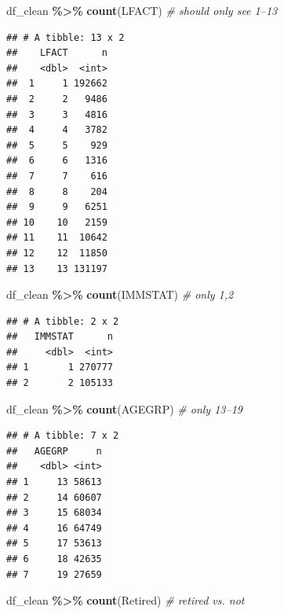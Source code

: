 \documentclass[
]{article}
\newenvironment{Shaded}{\begin{snugshade}}{\end{snugshade}}
\newcommand{\CommentTok}[1]{\textcolor[rgb]{0.56,0.35,0.01}{\textit{#1}}}
\newcommand{\FunctionTok}[1]{\textcolor[rgb]{0.13,0.29,0.53}{\textbf{#1}}}
\newcommand{\NormalTok}[1]{#1}
\newcommand{\SpecialCharTok}[1]{\textcolor[rgb]{0.81,0.36,0.00}{\textbf{#1}}}
\begin{document}
\begin{Shaded}
\begin{Highlighting}[]
\NormalTok{df\_clean }\SpecialCharTok{\%\textgreater{}\%} 
  \FunctionTok{count}\NormalTok{(LFACT)     }\CommentTok{\# should only see 1–13}
\end{Highlighting}
\end{Shaded}

\begin{verbatim}
## # A tibble: 13 x 2
##    LFACT      n
##    <dbl>  <int>
##  1     1 192662
##  2     2   9486
##  3     3   4816
##  4     4   3782
##  5     5    929
##  6     6   1316
##  7     7    616
##  8     8    204
##  9     9   6251
## 10    10   2159
## 11    11  10642
## 12    12  11850
## 13    13 131197
\end{verbatim}

\begin{Shaded}
\begin{Highlighting}[]
\NormalTok{df\_clean }\SpecialCharTok{\%\textgreater{}\%} 
  \FunctionTok{count}\NormalTok{(IMMSTAT)   }\CommentTok{\# only 1,2}
\end{Highlighting}
\end{Shaded}

\begin{verbatim}
## # A tibble: 2 x 2
##   IMMSTAT      n
##     <dbl>  <int>
## 1       1 270777
## 2       2 105133
\end{verbatim}

\begin{Shaded}
\begin{Highlighting}[]
\NormalTok{df\_clean }\SpecialCharTok{\%\textgreater{}\%} 
  \FunctionTok{count}\NormalTok{(AGEGRP)    }\CommentTok{\# only 13–19}
\end{Highlighting}
\end{Shaded}

\begin{verbatim}
## # A tibble: 7 x 2
##   AGEGRP     n
##    <dbl> <int>
## 1     13 58613
## 2     14 60607
## 3     15 68034
## 4     16 64749
## 5     17 53613
## 6     18 42635
## 7     19 27659
\end{verbatim}

\begin{Shaded}
\begin{Highlighting}[]
\NormalTok{df\_clean }\SpecialCharTok{\%\textgreater{}\%} 
  \FunctionTok{count}\NormalTok{(Retired)   }\CommentTok{\# retired vs. not}
\end{Highlighting}
\end{Shaded}
\end{document}
